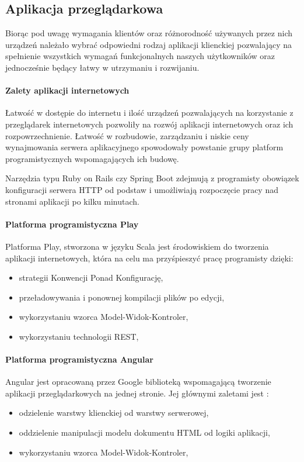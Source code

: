 \documentclass[a4paper,12pt,twoside]{article}
\begin{document}
\subsection{Aplikacja przeglądarkowa}
Biorąc pod uwagę wymagania klientów oraz różnorodność używanych przez nich urządzeń należało wybrać odpowiedni rodzaj aplikacji klienckiej pozwalający na spełnienie wszystkich wymagań funkcjonalnych naszych użytkowników 
oraz jednocześnie będący łatwy w utrzymaniu i rozwijaniu.

\paragraph{Zalety aplikacji internetowych}
Łatwość w dostępie do internetu i ilość urządzeń pozwalających na 
korzystanie z przeglądarek internetowych pozwoliły 
na rozwój aplikacji internetowych oraz ich rozpowrzechnienie.
Łatwość w rozbudowie, zarządzaniu i 
niskie ceny wynajmowania serwera aplikacyjnego spowodowały 
powstanie grupy platform programistycznych wspomagających ich budowę. 

Narzędzia typu Ruby on Rails czy Spring Boot 
zdejmują z programisty obowiązek konfiguracji serwera 
HTTP od podstaw i umożliwiają rozpoczęcie pracy  
nad stronami aplikacji po kilku minutach.

\paragraph{Platforma programistyczna Play}
Platforma Play, stworzona w języku Scala jest środowiskiem 
do tworzenia aplikacji internetowych, 
która na celu ma przyśpieszyć pracę programisty dzięki:
\begin{itemize}
\item strategii Konwencji Ponad Konfigurację,
\item przeładowywania i ponownej kompilacji plików po edycji,
\item wykorzystaniu wzorca Model-Widok-Kontroler,
\item wykorzystaniu technologii REST,
\end{itemize} 
  
\paragraph{Platforma programistyczna Angular}
Angular jest opracowaną przez Google biblioteką wspomagającą tworzenie 
aplikacji przeglądarkowych na jednej stronie. Jej głównymi zaletami jest :
\begin{itemize}
\item odzielenie warstwy klienckiej od warstwy serwerowej,
\item oddzielenie manipulacji modelu dokumentu HTML od logiki aplikacji,
\item wykorzystaniu wzorca Model-Widok-Kontroler,
\end{itemize} 
\end{document}
